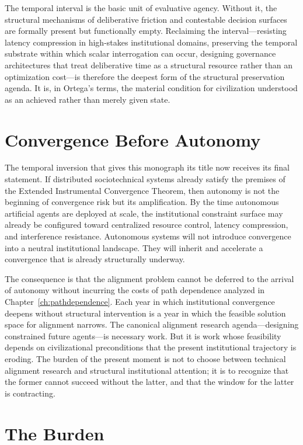 \documentclass[12pt, oneside]{book}
\theoremstyle{plain}
\theoremstyle{definition}
\theoremstyle{remark}
\theoremstyle{definition}
\begin{document}
The temporal interval is the basic unit of evaluative agency. Without it, the
structural mechanisms of deliberative friction and contestable decision surfaces
are formally present but functionally empty. Reclaiming the interval---resisting
latency compression in high-stakes institutional domains, preserving the temporal
substrate within which scalar interrogation can occur, designing governance
architectures that treat deliberative time as a structural resource rather than an
optimization cost---is therefore the deepest form of the structural preservation
agenda. It is, in Ortega's terms, the material condition for civilization understood
as an achieved rather than merely given state.

\section{Convergence Before Autonomy}

The temporal inversion that gives this monograph its title now receives its final
statement. If distributed sociotechnical systems already satisfy the premises of
the Extended Instrumental Convergence Theorem, then autonomy is not the beginning
of convergence risk but its amplification. By the time autonomous artificial agents
are deployed at scale, the institutional constraint surface may already be configured
toward centralized resource control, latency compression, and interference resistance.
Autonomous systems will not introduce convergence into a neutral institutional
landscape. They will inherit and accelerate a convergence that is already structurally
underway.

The consequence is that the alignment problem cannot be deferred to the arrival of
autonomy without incurring the costs of path dependence analyzed in
Chapter~\ref{ch:pathdependence}. Each year in which institutional convergence deepens
without structural intervention is a year in which the feasible solution space for
alignment narrows. The canonical alignment research agenda---designing constrained
future agents---is necessary work. But it is work whose feasibility depends on
civilizational preconditions that the present institutional trajectory is eroding.
The burden of the present moment is not to choose between technical alignment
research and structural institutional attention; it is to recognize that the former
cannot succeed without the latter, and that the window for the latter is contracting.

\section{The Burden}
\end{document}

